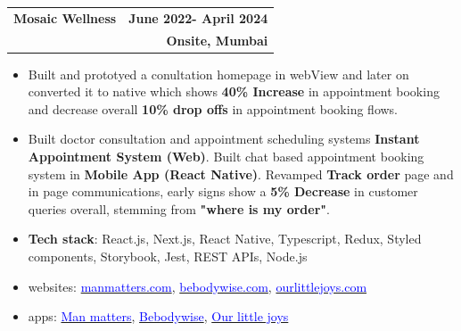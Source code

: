 \documentclass[a4paper,11pt]{article}
\makeatletter
\newcommand{\resumeExp}[4]{
\vspace{0mm}\item[]
    \begin{tabular*}{\textwidth}[t]{l@{\extracolsep{\fill}}r}
        \hspace{-4.4mm} \small\textbf{#1} & {\footnotesize{#3}}\vspace{-1.2mm}\\
        \hspace{-4.3mm} \footnotesize{\text{#2}} & \footnotesize{#4}
    \end{tabular*}
    \vspace{-6.1mm}
}
\newcommand{\resumeItemListStart}{\begin{justify}\begin{itemize}[leftmargin=3ex, rightmargin=2ex, noitemsep,labelsep=1.2mm,itemsep=0mm]\small}
\newcommand{\resumeItemListEnd}{\end{itemize}\end{justify}\vspace{-1.5mm}}
\makeatother
\begin{document}
\resumeExp
{Mosaic Wellness} 
{SDE 1}
{\textbf{June 2022- April 2024}} 
{\textbf{Onsite, Mumbai}}
\resumeItemListStart
\vspace{1mm}
\item[$\cdot$] Built and prototyed a conultation homepage in webView and later on converted it to native which shows \textbf{40\% Increase} in appointment booking and decrease overall \textbf{10\% drop offs} in appointment booking flows.
\item[$\cdot$]Built doctor consultation and appointment scheduling systems \textbf{Instant Appointment System (Web)}. Built chat based appointment booking system in \textbf{Mobile App (React Native)}. Revamped \textbf{Track order} page and in page communications, early signs show a \textbf{5\% Decrease} in customer queries overall, stemming from \textbf{"where is my order"}.
\item[$\cdot$] \textbf{Tech stack}: React.js, Next.js, React Native, Typescript, Redux, Styled components, Storybook, Jest, REST APIs, Node.js
\item [$\cdot$] websites: {\href{https://manmatters.com/}{\textcolor{blue}{manmatters.com}}}, {\href{https://bebodywise.com/}{\textcolor{blue}{bebodywise.com}}}, {\href{https://ourlittlejoys.com/}{\textcolor{blue}{ourlittlejoys.com}}}
\item [$\cdot$] apps: {\href{https://play.google.com/store/apps/details?id=com.mosaicwellness.manmatters&hl=en_IN&gl=US}{\textcolor{blue}{ Man matters}}}, {\href{https://play.google.com/store/apps/details?id=com.mosaicwellness.bebodywise&hl=en&gl=US}{\textcolor{blue}{ Bebodywise}}}, {\href{https://play.google.com/store/apps/details?id=com.mosaicwellness.ourlittlejoys&hl=en&gl=US}{\textcolor{blue}{ Our little joys}}}


\resumeItemListEnd
\end{document}
